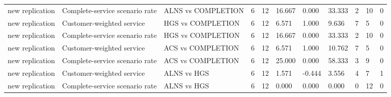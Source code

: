 \begin{tabular}{lllllllllll}
new replication & Complete-service scenario rate & ALNS vs COMPLETION & 6 & 12 & 16.667 & 0.000 & 33.333 & 2 & 10 & 0 \\
new replication & Customer-weighted service & HGS vs COMPLETION & 6 & 12 & 6.571 & 1.000 & 9.636 & 7 & 5 & 0 \\
new replication & Complete-service scenario rate & HGS vs COMPLETION & 6 & 12 & 16.667 & 0.000 & 33.333 & 2 & 10 & 0 \\
new replication & Customer-weighted service & ACS vs COMPLETION & 6 & 12 & 6.571 & 1.000 & 10.762 & 7 & 5 & 0 \\
new replication & Complete-service scenario rate & ACS vs COMPLETION & 6 & 12 & 25.000 & 0.000 & 58.333 & 3 & 9 & 0 \\
new replication & Customer-weighted service & ALNS vs HGS & 6 & 12 & 1.571 & -0.444 & 3.556 & 4 & 7 & 1 \\
new replication & Complete-service scenario rate & ALNS vs HGS & 6 & 12 & 0.000 & 0.000 & 0.000 & 0 & 12 & 0 \\
\hline
\end{tabular}
